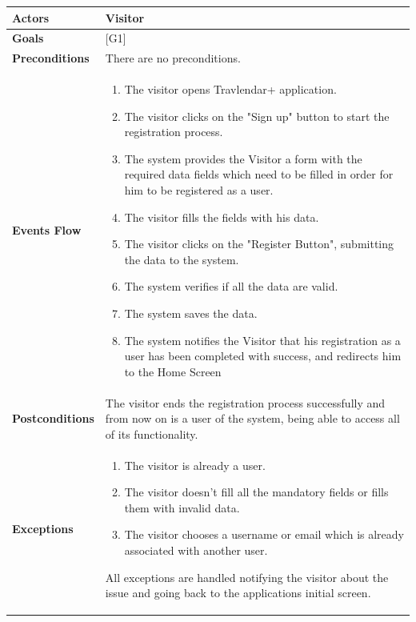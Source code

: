 \documentclass[12pt]{article}
\begin{document}
\begin{center}
    \begin{tabular} { |p{}|p{}| }
        \hline
        \textbf{Actors} & Visitor \\ 
        \hline
        \textbf{Goals} & {[G1]} \\ 
        \hline  
        \textbf{Preconditions} & There are no preconditions. \\ 
        \hline
        \textbf{Events Flow} & \begin{enumerate}[topsep=0pt]
                            \setlength{\itemsep}{0.5pt}
                            \item The visitor opens Travlendar+ application.
                            \item The visitor clicks on the "Sign up" button to start the registration process.
                            \item The system provides the Visitor a form with the required data fields which need to be filled in order for him to be registered as a user.
                            \item The visitor fills the fields with his data. 
                            \item The visitor clicks on the "Register Button", submitting the data to the system.
                            \item The system verifies if all the data are valid.
                            \item The system saves the data.
                            \item The system notifies the Visitor that his registration as a user has been completed with success, and redirects him to the Home Screen
                            \end{enumerate} \\
        \hline
        \textbf{Postconditions} & The visitor ends the registration process successfully and from now on is a user of the system, being able to access all of its functionality. \\
        \hline
        \textbf{Exceptions} & \begin{enumerate}[topsep=0pt]
                            \setlength{\itemsep}{0.5pt}
                            \item The visitor is already a user. 
                            \item The visitor doesn't fill all the mandatory fields or fills them with invalid data.
                            \item The visitor chooses a username or email which is already associated with another user.
                            \end{enumerate} 
                            All exceptions are handled notifying the visitor about the issue and going back to the applications initial screen.\\ 
        \hline
    \end{tabular}
\end{center}
\end{document}
